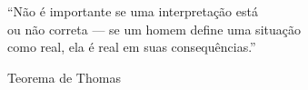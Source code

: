\cleardoublepage
\thispagestyle{empty}
\begin{center}
\vspace*{\fill}
\begin{flushright}
``Não é importante se uma interpretação está \\
ou não correta --- se um homem define uma situação \\
como real, ela é real em suas consequências.''

{\small Teorema de Thomas}
\end{flushright}
\end{center}
\cleardoublepage
